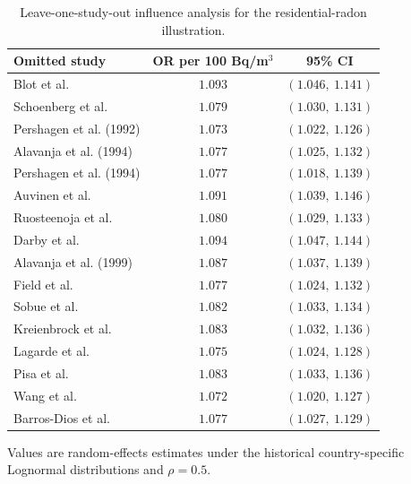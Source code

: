 \documentclass[11pt]{article}
\begin{document}
\begin{table}[htbp]
\centering
\caption{Leave-one-study-out influence analysis for the residential-radon illustration.}
\label{tab:supp_radon_loo}
\small
\begin{tabular}{lcc}
\toprule
Omitted study & OR per 100 Bq/m$^3$ & 95\% CI \\
\midrule
Blot et al. & $1.093$ & $(1.046,\ 1.141)$ \\
Schoenberg et al. & $1.079$ & $(1.030,\ 1.131)$ \\
Pershagen et al. (1992) & $1.073$ & $(1.022,\ 1.126)$ \\
Alavanja et al. (1994) & $1.077$ & $(1.025,\ 1.132)$ \\
Pershagen et al. (1994) & $1.077$ & $(1.018,\ 1.139)$ \\
Auvinen et al. & $1.091$ & $(1.039,\ 1.146)$ \\
Ruosteenoja et al. & $1.080$ & $(1.029,\ 1.133)$ \\
Darby et al. & $1.094$ & $(1.047,\ 1.144)$ \\
Alavanja et al. (1999) & $1.087$ & $(1.037,\ 1.139)$ \\
Field et al. & $1.077$ & $(1.024,\ 1.132)$ \\
Sobue et al. & $1.082$ & $(1.033,\ 1.134)$ \\
Kreienbrock et al. & $1.083$ & $(1.032,\ 1.136)$ \\
Lagarde et al. & $1.075$ & $(1.024,\ 1.128)$ \\
Pisa et al. & $1.083$ & $(1.033,\ 1.136)$ \\
Wang et al. & $1.072$ & $(1.020,\ 1.127)$ \\
Barros-Dios et al. & $1.077$ & $(1.027,\ 1.129)$ \\
\bottomrule
\end{tabular}
\par\smallskip
{\footnotesize Values are random-effects estimates under the historical country-specific Lognormal distributions and $\rho=0.5$.}
\end{table}
\end{document}
